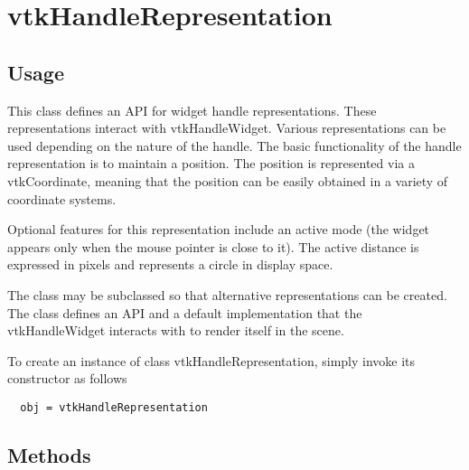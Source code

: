 \section{vtkHandleRepresentation}

\subsection{Usage}

 This class defines an API for widget handle representations. These
 representations interact with vtkHandleWidget. Various representations
 can be used depending on the nature of the handle. The basic functionality 
 of the handle representation is to maintain a position. The position is
 represented via a vtkCoordinate, meaning that the position can be easily
 obtained in a variety of coordinate systems.

 Optional features for this representation include an active mode (the widget
 appears only when the mouse pointer is close to it). The active distance is
 expressed in pixels and represents a circle in display space.

 The class may be subclassed so that alternative representations can
 be created.  The class defines an API and a default implementation that
 the vtkHandleWidget interacts with to render itself in the scene.

To create an instance of class vtkHandleRepresentation, simply
invoke its constructor as follows
\begin{verbatim}
  obj = vtkHandleRepresentation
\end{verbatim}
\subsection{Methods}

